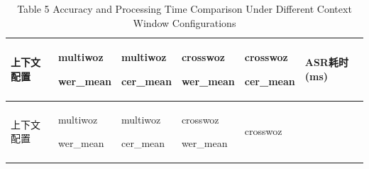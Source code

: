 \documentclass[
]{article}
\begin{document}
\begin{longtable}[]{@{}
  >{\centering\arraybackslash}p{}
  >{\centering\arraybackslash}p{}
  >{\centering\arraybackslash}p{}
  >{\centering\arraybackslash}p{}
  >{\centering\arraybackslash}p{}
  >{\centering\arraybackslash}p{}@{}}
\caption{Table 5 Accuracy and Processing Time Comparison Under Different Context Window Configurations}\tabularnewline
\toprule\noalign{}
\begin{minipage}[b]{\linewidth}\centering
上下文配置
\end{minipage} & \begin{minipage}[b]{\linewidth}\centering
multiwoz

wer\_mean
\end{minipage} & \begin{minipage}[b]{\linewidth}\centering
multiwoz

cer\_mean
\end{minipage} & \begin{minipage}[b]{\linewidth}\centering
crosswoz

wer\_mean
\end{minipage} & \begin{minipage}[b]{\linewidth}\centering
crosswoz

cer\_mean
\end{minipage} & \begin{minipage}[b]{\linewidth}\centering
ASR耗时(ms)
\end{minipage} \\
\midrule\noalign{}
\endfirsthead
\toprule\noalign{}
\begin{minipage}[b]{\linewidth}\centering
上下文配置
\end{minipage} & \begin{minipage}[b]{\linewidth}\centering
multiwoz

wer\_mean
\end{minipage} & \begin{minipage}[b]{\linewidth}\centering
multiwoz

cer\_mean
\end{minipage} & \begin{minipage}[b]{\linewidth}\centering
crosswoz

wer\_mean
\end{minipage} & \begin{minipage}[b]{\linewidth}\centering
crosswoz


\end{minipage}
\end{longtable}
\end{document}
